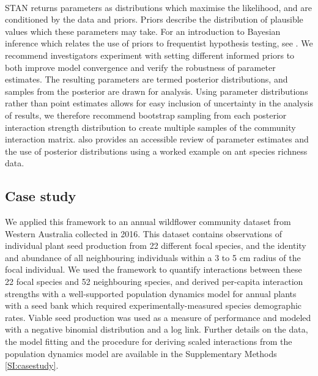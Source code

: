 \documentclass[a4,12pt]{article}
\begin{document}
        \paragraph{}
        STAN returns parameters as distributions which maximise the likelihood, and are conditioned by the data and priors. Priors describe the distribution of plausible values which these parameters may take. For an introduction to Bayesian inference which relates the use of priors to frequentist hypothesis testing, see \textcite{Ellison1996}. We recommend investigators experiment with setting different informed priors to both improve model convergence and verify the robustness of parameter estimates. The resulting parameters are termed posterior distributions, and samples from the posterior are drawn for analysis. Using parameter distributions rather than point estimates allows for easy inclusion of uncertainty in the analysis of results, we therefore recommend bootstrap sampling from each posterior interaction strength distribution to create multiple samples of the community interaction matrix. \textcite{Ellison2004} also provides an accessible review of parameter estimates and the use of posterior distributions using a worked example on ant species richness data.


    \subsection{Case study}

      
        We applied this framework to an annual wildflower community dataset from Western Australia collected in 2016. This dataset contains observations of individual plant seed production from 22 different focal species, and the identity and abundance of all neighbouring individuals within a 3 to 5 cm radius of the focal individual. We used the framework to quantify interactions between these 22 focal species and 52 neighbouring species, and derived per-capita interaction strengths with a well-supported population dynamics model for annual plants with a seed bank \parencite{Levine2009, Mayfield2017, Bimler2018} which required experimentally-measured species demographic rates. Viable seed production was used as a measure of performance and modeled with a negative binomial distribution and a log link.
        Further details on the data, the model fitting and the procedure for deriving scaled interactions from the population dynamics model are available in the Supplementary Methods \ref{SI:casestudy}.
\end{document}
